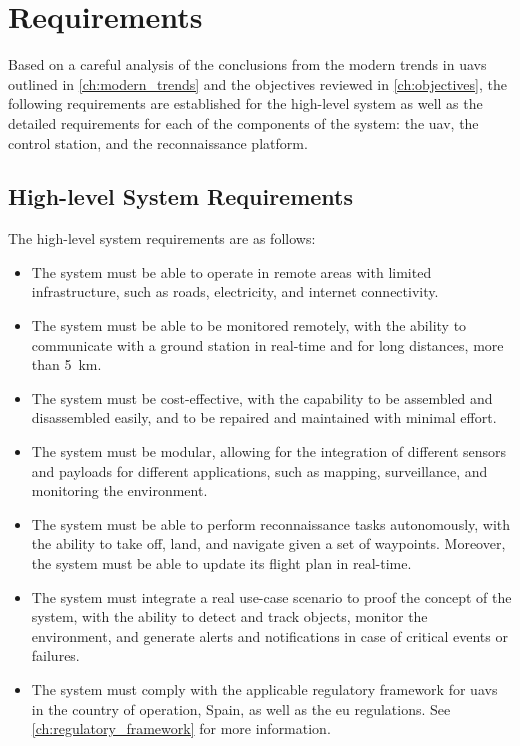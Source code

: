 \chapter{Requirements}\label{ch:requirements}

Based on a careful analysis of the conclusions from the modern trends in \glspl{uav} outlined in \cref{ch:modern_trends} and the objectives reviewed in \cref{ch:objectives}, the following requirements are established for the high-level system as well as the detailed requirements for each of the components of the system: the \gls{uav}, the control station, and the reconnaissance platform.

\section{High-level System Requirements}

The high-level system requirements are as follows:

\begin{itemize}
  \item The system must be able to operate in remote areas with limited infrastructure, such as roads, electricity, and internet connectivity.

  \item The system must be able to be monitored remotely, with the ability to communicate with a ground station in real-time and for long distances, more than \SI{5}{\kilo\meter}.

  \item The system must be cost-effective, with the capability to be assembled and disassembled easily, and to be repaired and maintained with minimal effort.

  \item The system must be modular, allowing for the integration of different sensors and payloads for different applications, such as mapping, surveillance, and monitoring the environment.

  \item The system must be able to perform reconnaissance tasks autonomously, with the ability to take off, land, and navigate given a set of waypoints. Moreover, the system must be able to update its flight plan in real-time.

  \item The system must integrate a real use-case scenario to proof the concept of the system, with the ability to detect and track objects, monitor the environment, and generate alerts and notifications in case of critical events or failures.

  \item The system must comply with the applicable regulatory framework for \glspl{uav} in the country of operation, Spain, as well as the \gls{eu} regulations. See \cref{ch:regulatory_framework} for more information.
\end{itemize}

